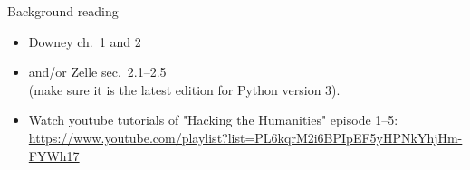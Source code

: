\documentclass[aspectratio=169,usenames,dvipsnames]{beamer}
\begin{document}
\begin{frame}{Background reading}
    \begin{itemize}
        \item Downey ch.\ 1 and 2
        \item and/or Zelle sec.\ 2.1--2.5 \\
            (make sure it is the latest edition for Python version 3).
        \item Watch youtube tutorials of "Hacking the Humanities" episode 1--5:
            {\small\url{https://www.youtube.com/playlist?list=PL6kqrM2i6BPIpEF5yHPNkYhjHm-FYWh17}}
    \end{itemize}
\end{frame}
\end{document}
